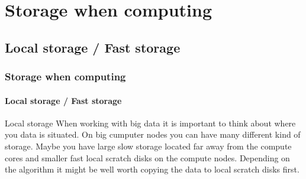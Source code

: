 \documentclass[aspectratio=169,usenames,dvipsnames]{beamer}
\begin{document}
\section{Storage when computing}
    \subsection{Local storage / Fast storage}
    \begin{frame}
        \frametitle{Storage when computing}
        \framesubtitle{Local storage / Fast storage}
        \begin{block}{Local storage}
        When working with big data it is important to think about where you
        data is situated. On big cumputer nodes you can have many different
        kind of storage. Maybe you have large slow storage located far away
        from the compute cores and smaller fast local scratch disks on the
        compute nodes. Depending on the algorithm it \alert{might be well worth
        copying the data to local scratch disks} first.
        \end{block}
    \end{frame}
\end{document}
